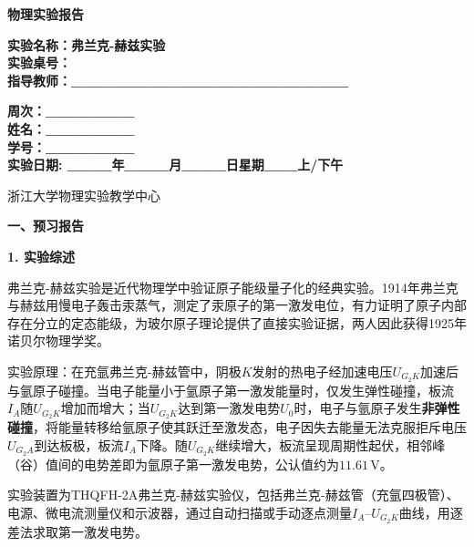 \documentclass[a4paper,12pt]{article}
\begin{document}
\begin{center}
    \vspace*{2cm}
    {\fontsize{36pt}{43pt}\selectfont \textbf{物理实验报告}}
    \vspace{3cm}
\end{center}

\begin{center}
    \fontsize{16pt}{24pt}\selectfont
    \textbf{实验名称：弗兰克-赫兹实验\quad} \\[0.5em]
    \textbf{实验桌号：\underline{\quad\quad\quad}} \\[0.5em]
    \textbf{指导教师：\_\_\_\_\_\_\_\_\_\_\_\_\_\_\_\_\_\_\_\_\_\_\_\_\_}
\end{center}

\vspace{2cm}

\begin{center}
    \fontsize{14pt}{28pt}\selectfont
    \textbf{周次：\_\_\_\_\_\_\_\_} \\
    \textbf{姓名：\_\_\_\_\_\_\_\_} \\
    \textbf{学号：\_\_\_\_\_\_\_\_} \\[0.5em]
    \textbf{实验日期: \_\_\_\_年\_\_\_\_月\_\_\_\_日\quad 星期\_\_\_上/下午}
\end{center}

\vspace{1.5cm}

\begin{center}
    \fontsize{14pt}{20pt}\selectfont
    浙江大学物理实验教学中心
\end{center}

\newpage

{\fontsize{16pt}{24pt}\selectfont \textbf{一、预习报告}}

\vspace{0.5cm}
{\fontsize{14pt}{20pt}\selectfont \textbf{1. 实验综述}}

\vspace{0.3cm}

{\fontsize{12pt}{18pt}\selectfont

弗兰克-赫兹实验是近代物理学中验证原子能级量子化的经典实验。1914年弗兰克与赫兹用慢电子轰击汞蒸气，测定了汞原子的第一激发电位，有力证明了原子内部存在分立的定态能级，为玻尔原子理论提供了直接实验证据，两人因此获得1925年诺贝尔物理学奖。

实验原理：在充氩弗兰克-赫兹管中，阴极$K$发射的热电子经加速电压$U_{G_2K}$加速后与氩原子碰撞。当电子能量小于氩原子第一激发能量时，仅发生弹性碰撞，板流$I_A$随$U_{G_2K}$增加而增大；当$U_{G_2K}$达到第一激发电势$U_0$时，电子与氩原子发生\textbf{非弹性碰撞}，将能量转移给氩原子使其跃迁至激发态，电子因失去能量无法克服拒斥电压$U_{G_2A}$到达板极，板流$I_A$下降。随$U_{G_2K}$继续增大，板流呈现周期性起伏，相邻峰（谷）值间的电势差即为氩原子第一激发电势，公认值约为$11.61$\,V。

实验装置为THQFH-2A弗兰克-赫兹实验仪，包括弗兰克-赫兹管（充氩四极管）、电源、微电流测量仪和示波器，通过自动扫描或手动逐点测量$I_A$--$U_{G_2K}$曲线，用逐差法求取第一激发电势。

}
\end{document}
